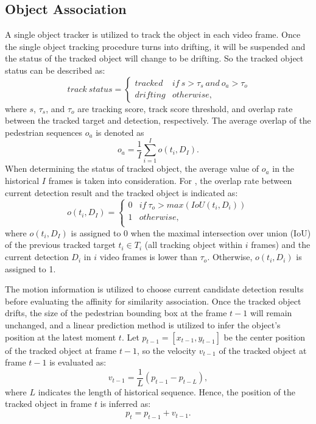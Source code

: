 \documentclass[times,twocolumn,final,authoryear]{elsarticle}
\begin{document}
\subsection{Object Association}
\label{sec:i2vtesting}
A single object tracker is utilized to track the object in each {video} frame.
Once the single object tracking procedure turns into drifting, it will be suspended and the status of the tracked object will change to be drifting.
So the tracked object status can be described as:
\begin{equation}
\ track \ status=\left\{
\begin{array}{rcl}
tracked & {if \ s > \tau_s \ and \ o_{a} > \tau_o}\\
drifting & {otherwise}, 
\end{array} \right.
\end{equation}
where $s$, $\tau_s$, and $\tau_o$ are tracking score, track score threshold, and overlap rate between the tracked target and detection, respectively.  
The average overlap of the pedestrian sequences $ o_{a} $ is denoted as 
\begin{equation}\label{eq:overlap_mean}
o_{a}=\frac{1}{I} \sum_{i=1}^{I} o\left(t_i,D_I\right).
\end{equation}
When determining the status of tracked object, the average value of $ o_a $ in the historical $ I $ frames is taken into consideration. 
For , the overlap rate between current detection result and the tracked object is indicated as{:} 
\begin{equation}
\label{overlap_target_detection}
o \left(t_i,D_I\right) =\left\{
\begin{array}{rcl}
0& {if \ \tau_o > max \left(IoU \left(t_i,D_i\right) \right) } \\
1& {otherwise}, \\
\end{array} \right.
\end{equation}
where $ o \left(t_i,D_I\right) $ is assigned to 0 when the maximal intersection over union (IoU) of the previous tracked target $ t_i \in T_i $ (all tracking object within $i$ frames) and the current detection $D_i$ in $i$ video frames is lower than $\tau_o$. 
Otherwise, $ o \left(t_i,D_i\right) $ is assigned to 1.

The motion information is utilized to choose current candidate detection results before evaluating the affinity for similarity association.
Once the tracked object drifts, the size of the pedestrian bounding box at the frame $ t-1 $ will remain unchanged, 
and a linear prediction method is utilized to infer the object's position at the latest moment $t$. 
Let $ p_{t-1}=\left[x_{t-1},y_{t-1}\right] $ be the center position of the tracked object at frame $ t-1 $,
so the velocity $ v_{t-1} $ of the tracked object at frame $ t-1 $ is evaluated as{:}
\begin{equation}
v_{t-1}=\frac{1}{L} \left( {p_{t-1}-p_{t-L}} \right),
\end{equation}
where $ L $ indicates the length of historical sequence. 
Hence, the position of the tracked object in frame $t$ is inferred as{:}
\begin{equation}
p_t=p_{t-1}+v_{t-1}.
\end{equation}
\end{document}
